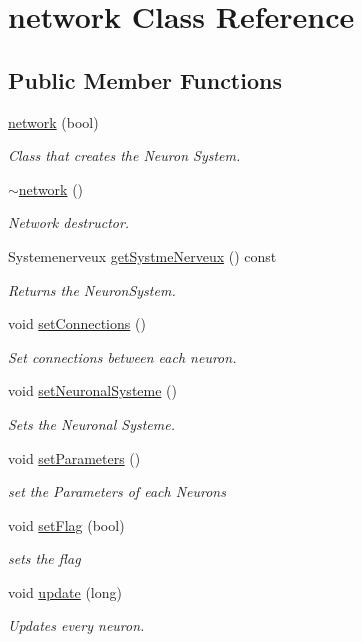 \hypertarget{classnetwork}{}\section{network Class Reference}
\label{classnetwork}
\subsection*{Public Member Functions}
\begin{DoxyCompactItemize}
\item 
\hyperlink{classnetwork_aac44f197a402ad67d1e7b266221bcca4}{network} (bool)
\begin{DoxyCompactList}\small\item\em Class that creates the Neuron System. \end{DoxyCompactList}\item 
\hyperlink{classnetwork_a37b843338509d5a411b3efe2b702da15}{$\sim$network} ()
\begin{DoxyCompactList}\small\item\em Network destructor. \end{DoxyCompactList}\item 
Systemenerveux \hyperlink{classnetwork_af0a14e17b85528ee182e35127de7e2b5}{get\+Systme\+Nerveux} () const
\begin{DoxyCompactList}\small\item\em Returns the Neuron\+System. \end{DoxyCompactList}\item 
void \hyperlink{classnetwork_acf46b197f5e56df426dc3f105add3e97}{set\+Connections} ()
\begin{DoxyCompactList}\small\item\em Set connections between each neuron. \end{DoxyCompactList}\item 
void \hyperlink{classnetwork_af9105fac7338bbd113d0823f837cf217}{set\+Neuronal\+Systeme} ()
\begin{DoxyCompactList}\small\item\em Sets the Neuronal Systeme. \end{DoxyCompactList}\item 
void \hyperlink{classnetwork_a6dda83ae384498619f0aa876639b2c25}{set\+Parameters} ()
\begin{DoxyCompactList}\small\item\em set the Parameters of each Neurons \end{DoxyCompactList}\item 
void \hyperlink{classnetwork_adec3ef8128235b2dc6d4d9df34e211b7}{set\+Flag} (bool)
\begin{DoxyCompactList}\small\item\em sets the flag \end{DoxyCompactList}\item 
void \hyperlink{classnetwork_a89f606204aa98943271e29f12b95f1ff}{update} (long)
\begin{DoxyCompactList}\small\item\em Updates every neuron. \end{DoxyCompactList}\end{DoxyCompactItemize}


